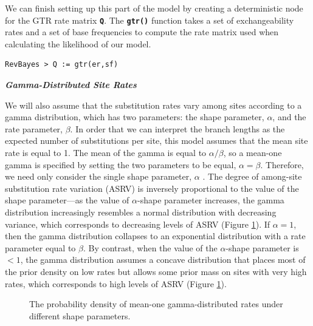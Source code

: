\documentclass[11pt]{article}
\newcommand{\cl}[1]{{\texttt{\textbf{#1}}}}
\begin{document}
We can finish setting up this part of the model by creating a deterministic node for the GTR rate matrix \cl{Q}. 
The \cl{gtr()} function takes a set of exchangeability rates and a set of base frequencies to compute the rate matrix used when calculating the likelihood of our model.
{\tt \begin{snugshade*}
\begin{lstlisting}
RevBayes > Q := gtr(er,sf)
\end{lstlisting}
\end{snugshade*}}


\textbf{\textit{Gamma-Distributed Site Rates}}


We will also assume that the substitution rates vary among sites according to a gamma distribution, which has two parameters: the shape parameter, $\alpha$, and the rate parameter, $\beta$. 
In order that we can interpret the branch lengths as the expected number of substitutions per site, this model assumes that the mean site rate is equal to 1.
The mean of the gamma is equal to $\alpha/\beta$, so a mean-one gamma is specified by setting the two parameters to be equal, $\alpha=\beta$.
Therefore, we need only consider the single shape parameter, $\alpha$ \citep{yang94a}. 
The degree of among-site substitution rate variation (ASRV) is inversely proportional to the value of the shape parameter---as the value of $\alpha$-shape parameter increases, the gamma distribution increasingly resembles a normal distribution with decreasing variance, which corresponds to decreasing levels of ASRV (Figure \ref{asrhGammaFig}).
If $\alpha = 1$, then the gamma distribution collapses to an exponential distribution with a rate parameter equal to $\beta$.
By contrast, when the value of the $\alpha$-shape parameter is $< 1$, the gamma distribution assumes a concave distribution that places most of the prior density on low rates but allows some prior mass on sites with very high rates, which corresponds to high levels of ASRV (Figure \ref{asrhGammaFig}).

\begin{figure}[h]
\centering
{}
\caption{\small The probability density of mean-one gamma-distributed rates under different shape parameters.}
\label{asrhGammaFig}
\end{figure}
\end{document}
